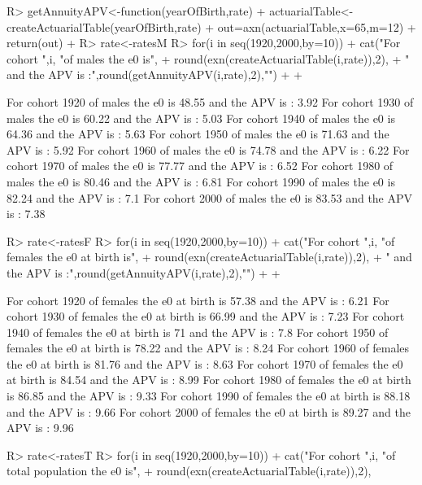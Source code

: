 \documentclass[nojss]{jss}
\begin{document}
\begin{Schunk}
\begin{Sinput}
R> 	getAnnuityAPV<-function(yearOfBirth,rate) {
+  		actuarialTable<-createActuarialTable(yearOfBirth,rate)
+  		out=axn(actuarialTable,x=65,m=12)
+  		return(out)
+  	}
R> rate<-ratesM
R> for(i in seq(1920,2000,by=10)) {
+  		cat("For cohort ",i, "of males the e0 is",
+  		round(exn(createActuarialTable(i,rate)),2),
+  		" and the APV is :",round(getAnnuityAPV(i,rate),2),"\n")
+  		
+  	}
\end{Sinput}
\begin{Soutput}
For cohort  1920 of males the e0 is 48.55  and the APV is : 3.92 
For cohort  1930 of males the e0 is 60.22  and the APV is : 5.03 
For cohort  1940 of males the e0 is 64.36  and the APV is : 5.63 
For cohort  1950 of males the e0 is 71.63  and the APV is : 5.92 
For cohort  1960 of males the e0 is 74.78  and the APV is : 6.22 
For cohort  1970 of males the e0 is 77.77  and the APV is : 6.52 
For cohort  1980 of males the e0 is 80.46  and the APV is : 6.81 
For cohort  1990 of males the e0 is 82.24  and the APV is : 7.1 
For cohort  2000 of males the e0 is 83.53  and the APV is : 7.38 
\end{Soutput}
\begin{Sinput}
R> rate<-ratesF
R> for(i in seq(1920,2000,by=10)) {
+    	cat("For cohort ",i, "of females the e0 at birth is",
+  	round(exn(createActuarialTable(i,rate)),2),
+  	" and the APV is :",round(getAnnuityAPV(i,rate),2),"\n")
+  		
+  	}
\end{Sinput}
\begin{Soutput}
For cohort  1920 of females the e0 at birth is 57.38  and the APV is : 6.21 
For cohort  1930 of females the e0 at birth is 66.99  and the APV is : 7.23 
For cohort  1940 of females the e0 at birth is 71  and the APV is : 7.8 
For cohort  1950 of females the e0 at birth is 78.22  and the APV is : 8.24 
For cohort  1960 of females the e0 at birth is 81.76  and the APV is : 8.63 
For cohort  1970 of females the e0 at birth is 84.54  and the APV is : 8.99 
For cohort  1980 of females the e0 at birth is 86.85  and the APV is : 9.33 
For cohort  1990 of females the e0 at birth is 88.18  and the APV is : 9.66 
For cohort  2000 of females the e0 at birth is 89.27  and the APV is : 9.96 
\end{Soutput}
\begin{Sinput}
R> rate<-ratesT
R> for(i in seq(1920,2000,by=10)) {
+      cat("For cohort ",i, "of total population the e0 is",
+  		round(exn(createActuarialTable(i,rate)),2),
}
\end{Sinput}
\end{Schunk}
\end{document}
